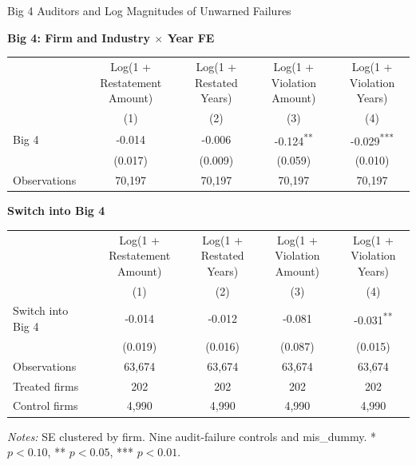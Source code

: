 \documentclass[10pt]{article}
\newcommand{\sym}[1]{\textsuperscript{#1}}
\begin{document}
\fontsize{10}{12}\selectfont
\setlength{\tabcolsep}{3pt}\renewcommand{\arraystretch}{1.15}
\begin{center}\large Big 4 Auditors and Log Magnitudes of Unwarned Failures\end{center}
\medskip\textbf{Big 4: Firm and Industry $\times$ Year FE}\par\smallskip
\begin{tabular*}{\textwidth}{@{\extracolsep{\fill}}lcccc@{}}
\toprule
 & \shortstack{Log(1 +\\Restatement Amount)} & \shortstack{Log(1 +\\Restated Years)} & \shortstack{Log(1 +\\Violation Amount)} & \shortstack{Log(1 +\\Violation Years)} \\
 & (1) & (2) & (3) & (4) \\
\midrule
Big 4 & -0.014 & -0.006 & -0.124\sym{**} & -0.029\sym{***} \\
 & (0.017) & (0.009) & (0.059) & (0.010) \\
Observations & 70,197 & 70,197 & 70,197 & 70,197 \\
\bottomrule\end{tabular*}\par
\medskip\textbf{Switch into Big 4}\par\smallskip
\begin{tabular*}{\textwidth}{@{\extracolsep{\fill}}lcccc@{}}
\toprule
 & \shortstack{Log(1 +\\Restatement Amount)} & \shortstack{Log(1 +\\Restated Years)} & \shortstack{Log(1 +\\Violation Amount)} & \shortstack{Log(1 +\\Violation Years)} \\
 & (1) & (2) & (3) & (4) \\
\midrule
Switch into Big 4 & -0.014 & -0.012 & -0.081 & -0.031\sym{**} \\
 & (0.019) & (0.016) & (0.087) & (0.015) \\
Observations & 63,674 & 63,674 & 63,674 & 63,674 \\
Treated firms & 202 & 202 & 202 & 202 \\
Control firms & 4,990 & 4,990 & 4,990 & 4,990 \\
\bottomrule\end{tabular*}\par
\medskip\fontsize{9}{11}\selectfont\textit{Notes:} SE clustered by firm. Nine audit-failure controls and mis\_dummy. * $p<0.10$, ** $p<0.05$, *** $p<0.01$.
\end{document}
